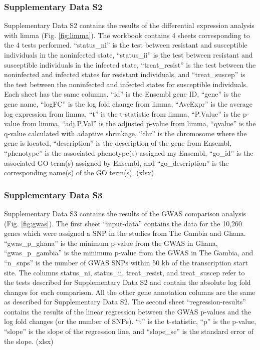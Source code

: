\documentclass[fleqn,10pt]{wlscirep}
\begin{document}
\subsubsection*{Supplementary Data S2}

Supplementary Data S2 contains the results of the differential
expression analysis with limma (Fig. \ref{fig:limma}). The workbook
contains 4 sheets corresponding to the 4 tests performed. “status\_ni”
is the test between resistant and susceptible individuals in the
noninfected state, “status\_ii” is the test between resistant and
susceptible individuals in the infected state, “treat\_resist” is the
test between the noninfected and infected states for resistant
individuals, and “treat\_suscep” is the test between the noninfected
and infected states for susceptible individuals. Each sheet has the
same columns. “id” is the Ensembl gene ID, “gene” is the gene name,
“logFC” is the log fold change from limma, “AveExpr” is the average
log expression from limma, “t” is the t-statistic from limma,
“P.Value” is the p-value from limma, “adj.P.Val” is the adjusted
p-value from limma, “qvalue” is the q-value calculated with adaptive
shrinkage, “chr” is the chromosome where the gene is located,
“description” is the description of the gene from Ensembl, “phenotype”
is the associated phenotype(s) assigned my Ensembl, “go\_id” is the
associated GO term(s) assigned by Ensembl, and “go\_description” is
the corresponding name(s) of the GO term(s). (xlsx)
\subsubsection*{Supplementary Data S3}

Supplementary Data S3 contains the results of the GWAS comparison
analysis (Fig. \ref{fig:gwas}). The first sheet “input-data” contains
the data for the 10,260 genes which were assigned a SNP in the studies
from The Gambia and Ghana. “gwas\_p\_ghana” is the minimum p-value
from the GWAS in Ghana, “gwas\_p\_gambia” is the minimum p-value from
the GWAS in The Gambia, and “n\_snps” is the number of GWAS SNPs
within 50 kb of the transcription start site. The columns status\_ni,
status\_ii, treat\_resist, and treat\_suscep refer to the tests
described for Supplementary Data S2 and contain the absolute log fold
changes for each comparison. All the other gene annotation columns are
the same as described for Supplementary Data S2. The second sheet
“regression-results” contains the results of the linear regression
between the GWAS p-values and the log fold changes (or the number of
SNPs). “t” is the t-statistic, “p” is the p-value, “slope” is the
slope of the regression line, and “slope\_se” is the standard error of
the slope. (xlsx)
\end{document}

